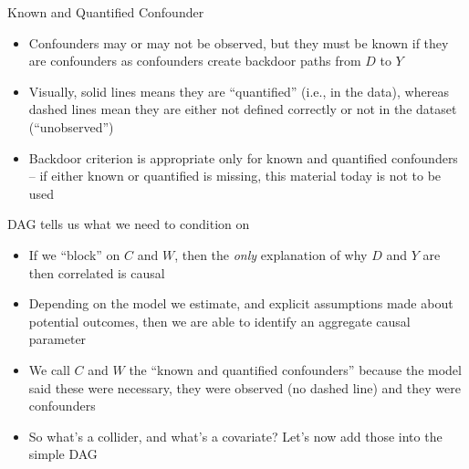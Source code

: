 \documentclass{beamer}
\begin{document}
\begin{frame}{Known and Quantified Confounder}

	\begin{itemize}
	\item Confounders may or may not be observed, but they must be known if they are confounders as confounders create backdoor paths from $D$ to $Y$
	\item Visually, solid lines means they are ``quantified'' (i.e., in the data), whereas dashed lines mean they are either not defined correctly or not in the dataset (``unobserved'')
	\item Backdoor criterion is appropriate only for known and quantified confounders -- if either known or quantified is missing, this material today is not to be used
	\end{itemize}

\end{frame}

\begin{frame}{DAG tells us what we need to condition on}

\begin{itemize}

\item If we ``block'' on $C$ and $W$, then the \emph{only} explanation of why $D$ and $Y$ are then correlated is causal
\item Depending on the model we estimate, and explicit assumptions made about potential outcomes, then we are able to identify an aggregate causal parameter
\item We call $C$ and $W$ the ``known and quantified confounders'' because the model said these were necessary, they were observed (no dashed line) and they were confounders
\item So what's a collider, and what's a covariate? Let's now add those into the simple DAG

\end{itemize}

\end{frame}
\end{document}
